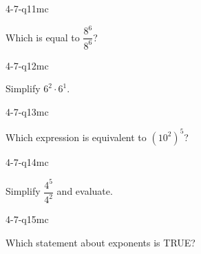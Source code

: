 \begin{practiceQuestion}{4-7-q11}{mc}
\begin{questionText}
Which is equal to $\dfrac{8^6}{8^6}$?
\end{questionText}
\end{practiceQuestion}

\begin{practiceQuestion}{4-7-q12}{mc}
\begin{questionText}
Simplify $6^2 \cdot 6^1$.
\end{questionText}
\end{practiceQuestion}

\begin{practiceQuestion}{4-7-q13}{mc}
\begin{questionText}
Which expression is equivalent to $(10^2)^5$?
\end{questionText}
\end{practiceQuestion}

\begin{practiceQuestion}{4-7-q14}{mc}
\begin{questionText}
Simplify $\dfrac{4^5}{4^2}$ and evaluate.
\end{questionText}
\end{practiceQuestion}

\begin{practiceQuestion}{4-7-q15}{mc}
\begin{questionText}
Which statement about exponents is TRUE?
\end{questionText}
\end{practiceQuestion}

